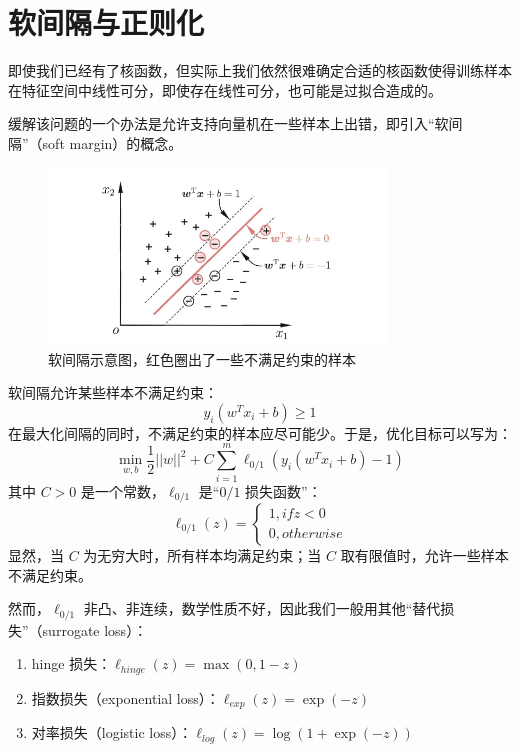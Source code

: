 \documentclass[12pt, a4paper]{article} %
\begin{document}
\section{软间隔与正则化}

即使我们已经有了核函数，但实际上我们依然很难确定合适的核函数使得训练样本在特征空间中线性可分，即使存在线性可分，也可能是过拟合造成的。

缓解该问题的一个办法是允许支持向量机在一些样本上出错，即引入“软间隔”（soft margin）的概念。

\begin{figure}[H]
    \centering
    \includegraphics[width=0.8\textwidth]{../img/6-5-软间隔示意图.png}
    \caption{软间隔示意图，红色圈出了一些不满足约束的样本}
    \label{fig:软间隔示意图}
\end{figure}

软间隔允许某些样本不满足约束：
\begin{equation*}
    y_i(w^T x_i + b) \ge 1
\end{equation*}
在最大化间隔的同时，不满足约束的样本应尽可能少。于是，优化目标可以写为：
\begin{equation*}
    \min_{w, b} \frac{1}{2} ||w||^2 + C \sum_{i = 1}^{m} \ell_{0 / 1} (y_i (w^T x_i + b) - 1)
\end{equation*}
其中 $C > 0$ 是一个常数，$\ell_{0 / 1}$ 是“$0 / 1$ 损失函数”：
\begin{equation*}
    \ell_{0 / 1}(z) = \left\{\begin{matrix}
        1, if z < 0 \\
        0, otherwise
    \end{matrix}\right.
\end{equation*}
显然，当 $C$ 为无穷大时，所有样本均满足约束；当 $C$ 取有限值时，允许一些样本不满足约束。

然而，$\ell_{0 / 1}$ 非凸、非连续，数学性质不好，因此我们一般用其他“替代损失”（surrogate loss）：

\begin{enumerate}[\hspace*{2em} i.]
    \item hinge 损失：$\ell_{hinge} (z) = \max (0, 1 - z)$
    \item 指数损失（exponential loss）：$\ell_{exp} (z) = \exp (-z)$
    \item 对率损失（logistic loss）：$\ell_{log} (z) = \log(1 + \exp(-z))$
\end{enumerate}
\end{document}
